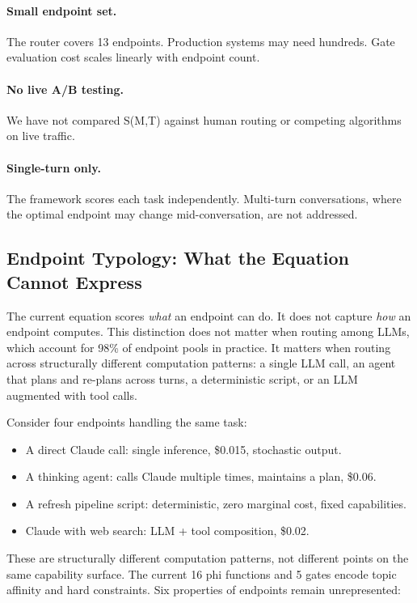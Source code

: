 \paragraph{Small endpoint set.} The router covers 13 endpoints. Production systems may need hundreds. Gate evaluation cost scales linearly with endpoint count.

\paragraph{No live A/B testing.} We have not compared S(M,T) against human routing or competing algorithms on live traffic.

\paragraph{Single-turn only.} The framework scores each task independently. Multi-turn conversations, where the optimal endpoint may change mid-conversation, are not addressed.

\subsection{Endpoint Typology: What the Equation Cannot Express}
\label{sec:typology}

The current equation scores \textit{what} an endpoint can do. It does not capture \textit{how} an endpoint computes. This distinction does not matter when routing among LLMs, which account for 98\% of endpoint pools in practice. It matters when routing across structurally different computation patterns: a single LLM call, an agent that plans and re-plans across turns, a deterministic script, or an LLM augmented with tool calls.

Consider four endpoints handling the same task:

\begin{itemize}
    \item A direct Claude call: single inference, \$0.015, stochastic output.
    \item A thinking agent: calls Claude multiple times, maintains a plan, \$0.06.
    \item A refresh pipeline script: deterministic, zero marginal cost, fixed capabilities.
    \item Claude with web search: LLM + tool composition, \$0.02.
\end{itemize}

These are structurally different computation patterns, not different points on the same capability surface. The current 16 phi functions and 5 gates encode topic affinity and hard constraints. Six properties of endpoints remain unrepresented:

